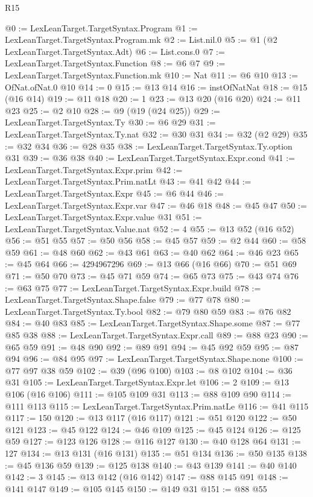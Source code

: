 \begin{lexlean}{R15}
\begin{coremodule}
@0 := LexLeanTarget.TargetSyntax.Program
@1 := LexLeanTarget.TargetSyntax.Program.mk
@2 := List.nil.{0}
@5 := @1 (@2 LexLeanTarget.TargetSyntax.Adt)
@6 := List.cons.{0}
@7 := LexLeanTarget.TargetSyntax.Function
@8 := @6 @7
@9 := LexLeanTarget.TargetSyntax.Function.mk
@10 := Nat
@11 := @6 @10
@13 := OfNat.ofNat.{0} @10
@14 := 0
@15 := @13 @14
@16 := instOfNatNat
@18 := @15 (@16 @14)
@19 := @11 @18
@20 := 1
@23 := @13 @20 (@16 @20)
@24 := @11 @23
@25 := @2 @10
@28 := @9 (@19 (@24 @25))
@29 := LexLeanTarget.TargetSyntax.Ty
@30 := @6 @29
@31 := LexLeanTarget.TargetSyntax.Ty.nat
@32 := @30 @31
@34 := @32 (@2 @29)
@35 := @32 @34
@36 := @28 @35
@38 := LexLeanTarget.TargetSyntax.Ty.option @31
@39 := @36 @38
@40 := LexLeanTarget.TargetSyntax.Expr.cond
@41 := LexLeanTarget.TargetSyntax.Expr.prim
@42 := LexLeanTarget.TargetSyntax.Prim.natLt
@43 := @41 @42
@44 := LexLeanTarget.TargetSyntax.Expr
@45 := @6 @44
@46 := LexLeanTarget.TargetSyntax.Expr.var
@47 := @46 @18
@48 := @45 @47
@50 := LexLeanTarget.TargetSyntax.Expr.value @31
@51 := LexLeanTarget.TargetSyntax.Value.nat
@52 := 4
@55 := @13 @52 (@16 @52)
@56 := @51 @55
@57 := @50 @56
@58 := @45 @57
@59 := @2 @44
@60 := @58 @59
@61 := @48 @60
@62 := @43 @61
@63 := @40 @62
@64 := @46 @23
@65 := @45 @64
@66 := 4294967296
@69 := @13 @66 (@16 @66)
@70 := @51 @69
@71 := @50 @70
@73 := @45 @71 @59
@74 := @65 @73
@75 := @43 @74
@76 := @63 @75
@77 := LexLeanTarget.TargetSyntax.Expr.build
@78 := LexLeanTarget.TargetSyntax.Shape.false
@79 := @77 @78
@80 := LexLeanTarget.TargetSyntax.Ty.bool
@82 := @79 @80 @59
@83 := @76 @82
@84 := @40 @83
@85 := LexLeanTarget.TargetSyntax.Shape.some
@87 := @77 @85 @38
@88 := LexLeanTarget.TargetSyntax.Expr.call
@89 := @88 @23
@90 := @65 @59
@91 := @48 @90
@92 := @89 @91
@94 := @45 @92 @59
@95 := @87 @94
@96 := @84 @95
@97 := LexLeanTarget.TargetSyntax.Shape.none
@100 := @77 @97 @38 @59
@102 := @39 (@96 @100)
@103 := @8 @102
@104 := @36 @31
@105 := LexLeanTarget.TargetSyntax.Expr.let
@106 := 2
@109 := @13 @106 (@16 @106)
@111 := @105 @109 @31
@113 := @88 @109 @90
@114 := @111 @113
@115 := LexLeanTarget.TargetSyntax.Prim.natLe
@116 := @41 @115
@117 := 150
@120 := @13 @117 (@16 @117)
@121 := @51 @120
@122 := @50 @121
@123 := @45 @122
@124 := @46 @109
@125 := @45 @124
@126 := @125 @59
@127 := @123 @126
@128 := @116 @127
@130 := @40 @128 @64
@131 := 127
@134 := @13 @131 (@16 @131)
@135 := @51 @134
@136 := @50 @135
@138 := @45 @136 @59
@139 := @125 @138
@140 := @43 @139
@141 := @40 @140
@142 := 3
@145 := @13 @142 (@16 @142)
@147 := @88 @145 @91
@148 := @141 @147
@149 := @105 @145
@150 := @149 @31
@151 := @88 @55

\end{coremodule}
\end{lexlean}
